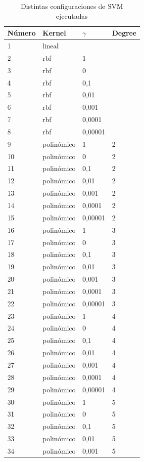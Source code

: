 \documentclass[journal]{IEEEtran}
\begin{document}
\begin{table}[ht!]
\caption{Distintas configuraciones de SVM ejecutadas}
\label{table:svm_config}
\centering
\begin{tabular}{l | l l l }
Número & Kernel & $\gamma$ & Degree  \\
\hline
1 & lineal &  &  \\ 
2 & rbf  & 1  &  \\ 
3 & rbf  & 0 &  \\ 
4 & rbf  & 0,1 &  \\ 
5 & rbf  & 0,01 &  \\ 
6 & rbf  & 0,001 &  \\ 
7 & rbf  & 0,0001 &  \\ 
8 & rbf  & 0,00001 &  \\ 
9 & polinómico & 1  & 2 \\ 
10 & polinómico & 0  & 2 \\ 
11 & polinómico & 0,1  & 2 \\ 
12 & polinómico & 0,01  & 2 \\ 
13 & polinómico & 0,001  & 2 \\ 
14 & polinómico & 0,0001  & 2 \\ 
15 & polinómico & 0,00001  & 2 \\ 
16 & polinómico & 1  & 3 \\ 
17 & polinómico & 0  & 3 \\ 
18 & polinómico & 0,1  & 3 \\ 
19 & polinómico & 0,01  & 3 \\ 
20 & polinómico & 0,001  & 3 \\ 
21 & polinómico & 0,0001  & 3 \\ 
22 & polinómico & 0,00001  & 3 \\ 
23 & polinómico & 1  & 4 \\ 
24 & polinómico & 0  & 4 \\ 
25 & polinómico & 0,1  & 4 \\ 
26 & polinómico & 0,01  & 4 \\ 
27 & polinómico & 0,001  & 4 \\ 
28 & polinómico & 0,0001  & 4 \\ 
29 & polinómico & 0,00001  & 4 \\ 
30 & polinómico & 1  & 5 \\ 
31 & polinómico & 0  & 5 \\ 
32 & polinómico & 0,1  & 5 \\ 
33 & polinómico & 0,01  & 5 \\ 
34 & polinómico & 0,001  & 5 \\ 

\end{tabular}
\end{table}
\end{document}
